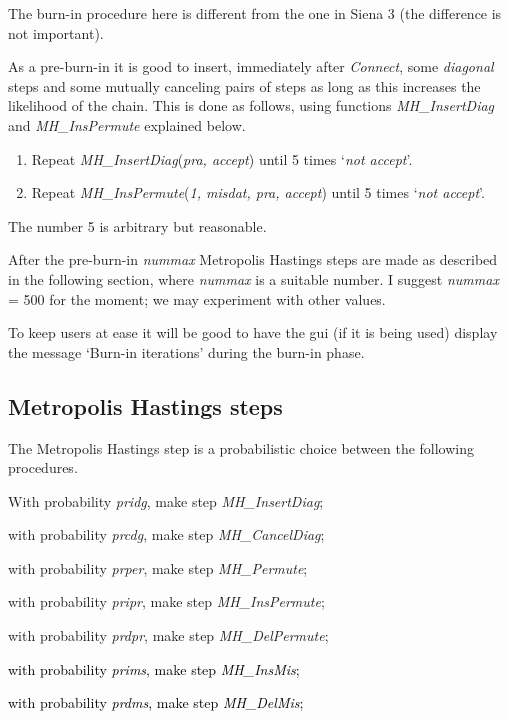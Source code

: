 \documentclass[a4paper,12pt,fleqn]{article}
\newcommand{\addcf}[1]{{\textcolor[named]{Black}{#1}}}
\begin{document}
The burn-in procedure here is different from the one in Siena 3
(the difference is not important).

As a pre-burn-in it is good to insert, immediately after
\emph{Connect}, some \textit{diagonal} steps and some mutually canceling pairs of steps
as long as this increases the likelihood of the chain.
This is done as follows, using functions  \textit{MH\_InsertDiag} and \textit{MH\_InsPermute}
explained below.
\begin{enumerate}[resume]
\item Repeat \textit{MH\_InsertDiag}(\textit{pra, accept}) until 5 times `\textit{not accept}'.
\item Repeat \textit{MH\_InsPermute}(\textit{1, misdat, pra, accept}) until 5 times `\textit{not accept}'.
\end{enumerate}
The number 5 is arbitrary but reasonable.

After the pre-burn-in \textit{nummax} Metropolis Hastings steps are made
as described in the following section,
where \textit{nummax} is a suitable number.
I suggest \textit{nummax} = 500 for the moment; we may experiment
with other values.

To keep users at ease it will be good to have the gui
(if it is being used) display the message
`Burn-in iterations' during the burn-in phase.

\subsection{Metropolis Hastings steps}

The Metropolis Hastings step is a probabilistic choice
between the following procedures.

\begin{enumerate}
\item With probability  \textit{pridg}, make  step \textit{MH\_InsertDiag};
\item with probability  \textit{prcdg}, make  step \textit{MH\_CancelDiag};
\item with probability  \textit{prper}, make  step \textit{MH\_Permute};
\item with probability  \textit{pripr}, make  step \textit{MH\_InsPermute};
\item with probability  \textit{prdpr}, make  step \textit{MH\_DelPermute};
\addcf{
\item with probability  \textit{prims}, make step \textit{MH\_InsMis};
\item with probability  \textit{prdms}, make step \textit{MH\_DelMis};
}
\end{enumerate}
\end{document}
